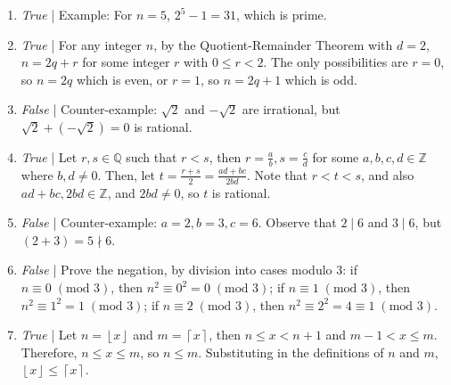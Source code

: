 \documentclass[a4paper,12pt]{article}
\newcommand{\floor}[1]{\left\lfloor #1 \right\rfloor}
\newcommand{\ceil}[1]{\left\lceil #1 \right\rceil}
\begin{document}
\begin{enumerate}
\item {\em True} | Example: For $n = 5$, $2^5 - 1 = 31$, which is prime.
\item {\em True} | For any integer $n$, by the Quotient-Remainder Theorem with
$d = 2$, $n = 2q + r$ for some integer $r$ with $0 \leq r < 2$. The only
possibilities are $r = 0$, so $n = 2q$ which is even, or $r = 1$, so $n = 2q+1$
which is odd.
\item {\em False} | Counter-example: $\sqrt{2}$ and $-\sqrt{2}$ are irrational,
but $\sqrt{2} + (-\sqrt{2}) = 0$ is rational.
\item {\em True} | Let $r, s \in \mathbb{Q}$ such that $r < s$, then $r = \frac{a}{b},
s = \frac{c}{d}$ for some $a, b, c, d \in \mathbb{Z}$ where $b, d \neq 0$. Then,
let $t = \frac{r+s}{2} = \frac{ad + bc}{2bd}$. Note that $r < t < s$, and also
$ad + bc, 2bd \in \mathbb{Z}$, and $2bd \neq 0$, so $t$ is rational.
\item {\em False} | Counter-example: $a = 2, b = 3, c = 6$. Observe that
$2 \mid 6$ and $3 \mid 6$, but $(2 + 3) = 5 \nmid 6$.
\item {\em False} | Prove the negation, by division into cases modulo 3:
if $n \equiv 0 \; (\text{mod } 3)$, then $n^2 \equiv 0^2 = 0 \; (\text{mod } 3)$;
if $n \equiv 1 \; (\text{mod } 3)$, then $n^2 \equiv 1^2 = 1 \; (\text{mod } 3)$;
if $n \equiv 2 \; (\text{mod } 3)$, then $n^2 \equiv 2^2 = 4 \equiv 1 \; (\text{mod } 3)$.
\item {\em True} | Let $n = \floor{x}$ and $m = \ceil{x}$, then $n \leq x < n + 1$
and $m-1 < x \leq m$. Therefore, $n \leq x \leq m$, so $n \leq m$. Substituting
in the definitions of $n$ and $m$, $\floor{x} \leq \ceil{x}$.
\end{enumerate}
\end{document}
